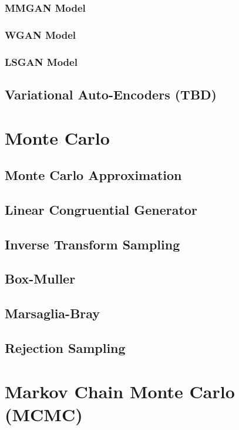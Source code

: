 \documentclass{article}
\begin{document}
\subsubsection{MMGAN Model}
\subsubsection{WGAN Model}
\subsubsection{LSGAN Model}

\subsection{Variational Auto-Encoders (TBD)}


\section{Monte Carlo}
\subsection{Monte Carlo Approximation}
\subsection{Linear Congruential Generator}
\subsection{Inverse Transform Sampling}
\subsection{Box-Muller}
\subsection{Marsaglia-Bray}
\subsection{Rejection Sampling}

\section{Markov Chain Monte Carlo (MCMC)}
\end{document}
